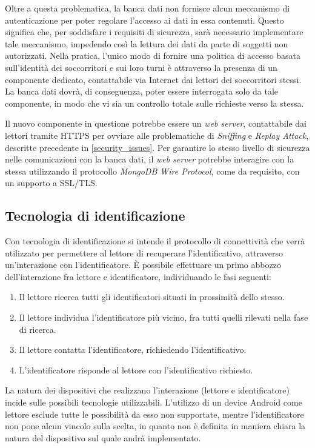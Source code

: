 \documentclass[a4paper,12pt]{report}
\begin{document}
Oltre a questa problematica, la banca dati non fornisce alcun meccanismo di autenticazione per poter regolare l'accesso ai dati in essa contenuti. Questo significa che, per soddisfare i requisiti di sicurezza, sarà necessario implementare tale meccanismo, impedendo così la lettura dei dati da parte di soggetti non autorizzati. Nella pratica, l'unico modo di fornire una politica di accesso basata sull'identità dei soccorritori e sui loro turni è attraverso la presenza di un componente dedicato, contattabile via Internet dai lettori dei soccorritori stessi. La banca dati dovrà, di conseguenza, poter essere interrogata solo da tale componente, in modo che vi sia un controllo totale sulle richieste verso la stessa. 

Il nuovo componente in questione potrebbe essere un \emph{web server}, contattabile dai lettori tramite HTTPS per ovviare alle problematiche di \emph{Sniffing} e \emph{Replay Attack}, descritte precedente in \autoref{security_issues}. Per garantire lo stesso livello di sicurezza nelle comunicazioni con la banca dati, il \emph{web server} potrebbe interagire con la stessa utilizzando il protocollo \emph{MongoDB Wire Protocol}, come da requisito, con un supporto a SSL/TLS. 

\subsection{Tecnologia di identificazione} \label{tec-id}
Con tecnologia di identificazione si intende il protocollo di connettività che verrà utilizzato per permettere al lettore di recuperare l'identificativo, attraverso un'interazione con l'identificatore. È possibile effettuare un primo abbozzo dell'interazione fra lettore e identificatore, individuando le fasi seguenti:
\begin{enumerate}
	\item Il lettore ricerca tutti gli identificatori situati in prossimità dello stesso.
	\item Il lettore individua l'identificatore più vicino, fra tutti quelli rilevati nella fase di ricerca.
	\item Il lettore contatta l'identificatore, richiedendo l'identificativo.
	\item L'identificatore risponde al lettore con l'identificativo richiesto.
\end{enumerate}
La natura dei dispositivi che realizzano l'interazione (lettore e identificatore) incide sulle possibili tecnologie utilizzabili. L'utilizzo di un device Android come lettore esclude tutte le possibilità da esso non supportate, mentre l'identificatore non pone alcun vincolo sulla scelta, in quanto non è definita in maniera chiara la natura del dispositivo sul quale andrà implementato.
\end{document}
